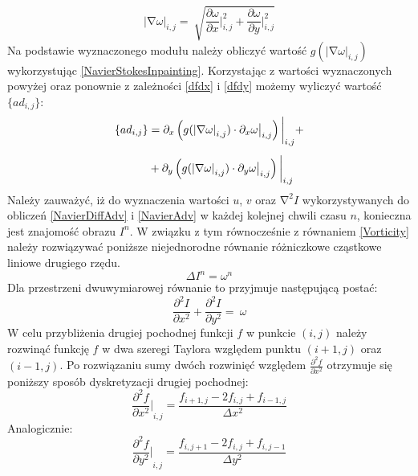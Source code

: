\documentclass[12pt, twoside, openany]{report}
\theoremstyle{definition}
\begin{document}
\begin{equation}
{\left|\mathrm{\nabla }\omega \right|}_{i,j}=\ \sqrt{\frac{\partial \omega }{\partial x}\bigg|^2_{i,j}+\frac{\partial \omega }{\partial y}\bigg|^2_{i,j}}
\label{magnitudedw}
\end{equation}
Na podstawie wyznaczonego modułu należy obliczyć wartość $g{\left({\left|\mathrm{\nabla }\omega \right|}_{i,j}\right)}$ wykorzystując \eqref{NavierStokesInpainting}. Korzystając z wartości wyznaczonych powyżej oraz ponownie z zależności \eqref{dfdx} i \eqref{dfdy} możemy wyliczyć wartość $\{ad_{i,j}\} $:
\begin{align}
\{ad_{i,j}\} &= \partial_x \left( g(\left| \nabla\omega \right|_{i,j}) \cdot \partial_x \omega \big|_{i,j} \right) \bigg|_{i,j} \notag +\\[1ex]
&+ \partial_y \left( g(\left|\nabla\omega\right|_{i,j}) \cdot \partial_y \omega \big|_{i,j} \right)\bigg|_{i,j}
\label{discreteAnisotropic}
\end{align}
Należy zauważyć, iż do wyznaczenia wartości $u$, $v$ oraz ${\mathrm{\nabla }}^2I$ wykorzystywanych do obliczeń \eqref{NavierDiffAdv} i \eqref{NavierAdv} w każdej kolejnej chwili czasu $n$, konieczna jest znajomość obrazu $I^n$. W związku z tym równocześnie z równaniem \eqref{Vorticity} należy rozwiązywać poniższe niejednorodne równanie różniczkowe cząstkowe liniowe drugiego rzędu.
\begin{equation}
\Delta I^n={\omega }^n
\label{Poisson}
\end{equation}
Dla przestrzeni dwuwymiarowej równanie to przyjmuje następującą postać:
\begin{equation}
\frac{{\partial }^2I}{\partial x^2}+\frac{{\partial }^2I}{\partial y^2}=\ \omega
\label{Poisson2D}
\end{equation}
W celu przybliżenia drugiej pochodnej funkcji $f$ w punkcie $(i,j)$ należy rozwinąć funkcję $f$ w dwa szeregi Taylora względem punktu $(i+1,j)$ oraz $(i-1,j)$. Po rozwiązaniu sumy dwóch rozwinięć względem $\frac{{\partial }^2f}{\partial x^2}$ otrzymuje się poniższy sposób dyskretyzacji drugiej pochodnej:
\begin{equation}
{\frac{{\partial }^2f}{\partial x^2}\bigg|}_{i,j}\mathrm{=}\frac{f_{i+1,j}-2f_{i,j}+f_{i-1,j}}{\Delta x^2}
\label{d2fdx2}
\end{equation}
Analogicznie:
\begin{equation}
{\frac{{\partial }^2f}{\partial y^2}\bigg|}_{i,j}\mathrm{=}\frac{f_{i,j+1}-2f_{i,j}+f_{i,j-1}}{\Delta y^2}
\label{d2fdy2}
\end{equation}
\end{document}
